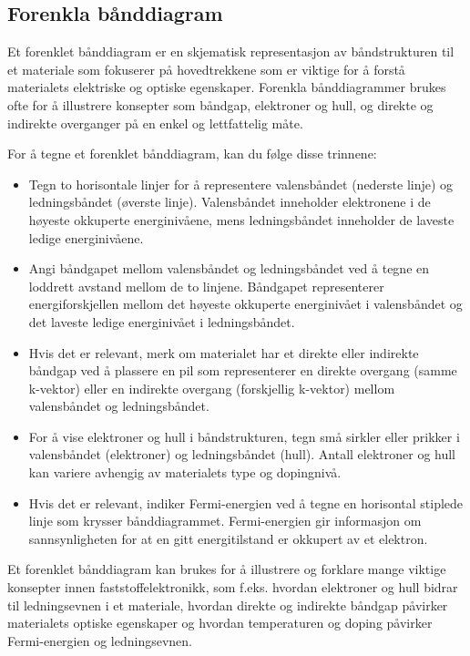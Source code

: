 \subsection*{Forenkla bånddiagram}

Et forenklet bånddiagram er en skjematisk representasjon av båndstrukturen til et materiale som fokuserer på hovedtrekkene som er viktige for å forstå materialets elektriske og optiske egenskaper. Forenkla bånddiagrammer brukes ofte for å illustrere konsepter som båndgap, elektroner og hull, og direkte og indirekte overganger på en enkel og lettfattelig måte.

For å tegne et forenklet bånddiagram, kan du følge disse trinnene:


\begin{itemize}
    \item Tegn to horisontale linjer for å representere valensbåndet (nederste linje) og ledningsbåndet (øverste linje). Valensbåndet inneholder elektronene i de høyeste okkuperte energinivåene, mens ledningsbåndet inneholder de laveste ledige energinivåene.
    \item Angi båndgapet mellom valensbåndet og ledningsbåndet ved å tegne en loddrett avstand mellom de to linjene. Båndgapet representerer energiforskjellen mellom det høyeste okkuperte energinivået i valensbåndet og det laveste ledige energinivået i ledningsbåndet.
    \item Hvis det er relevant, merk om materialet har et direkte eller indirekte båndgap ved å plassere en pil som representerer en direkte overgang (samme k-vektor) eller en indirekte overgang (forskjellig k-vektor) mellom valensbåndet og ledningsbåndet.
    \item For å vise elektroner og hull i båndstrukturen, tegn små sirkler eller prikker i valensbåndet (elektroner) og ledningsbåndet (hull). Antall elektroner og hull kan variere avhengig av materialets type og dopingnivå.
    \item Hvis det er relevant, indiker Fermi-energien ved å tegne en horisontal stiplede linje som krysser bånddiagrammet. Fermi-energien gir informasjon om sannsynligheten for at en gitt energitilstand er okkupert av et elektron.
\end{itemize}

Et forenklet bånddiagram kan brukes for å illustrere og forklare mange viktige konsepter innen faststoffelektronikk, som f.eks. hvordan elektroner og hull bidrar til ledningsevnen i et materiale, hvordan direkte og indirekte båndgap påvirker materialets optiske egenskaper og hvordan temperaturen og doping påvirker Fermi-energien og ledningsevnen.